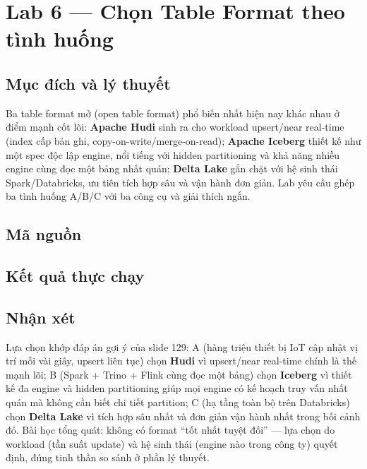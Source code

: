 \documentclass[12pt,a4paper,oneside]{article}
\begin{document}
\section{Lab 6 --- Chọn Table Format theo tình huống}
\label{sec:lab6}

\subsection{Mục đích và lý thuyết}

Ba table format mở (open table format) phổ biến nhất hiện nay khác nhau ở điểm mạnh cốt lõi: \textbf{Apache Hudi} sinh ra cho workload upsert/near real-time (index cấp bản ghi, copy-on-write/merge-on-read); \textbf{Apache Iceberg} thiết kế như một spec độc lập engine, nổi tiếng với hidden partitioning và khả năng nhiều engine cùng đọc một bảng nhất quán; \textbf{Delta Lake} gắn chặt với hệ sinh thái Spark/Databricks, ưu tiên tích hợp sâu và vận hành đơn giản. Lab yêu cầu ghép ba tình huống A/B/C với ba công cụ và giải thích ngắn.

\subsection{Mã nguồn}



\subsection{Kết quả thực chạy}



\subsection{Nhận xét}

Lựa chọn khớp đáp án gợi ý của slide 129: A (hàng triệu thiết bị IoT cập nhật vị trí mỗi vài giây, upsert liên tục) chọn \textbf{Hudi} vì upsert/near real-time chính là thế mạnh lõi; B (Spark + Trino + Flink cùng đọc một bảng) chọn \textbf{Iceberg} vì thiết kế đa engine và hidden partitioning giúp mọi engine có kế hoạch truy vấn nhất quán mà không cần biết chi tiết partition; C (hạ tầng toàn bộ trên Databricks) chọn \textbf{Delta Lake} vì tích hợp sâu nhất và đơn giản vận hành nhất trong bối cảnh đó. Bài học tổng quát: không có format ``tốt nhất tuyệt đối'' --- lựa chọn do workload (tần suất update) và hệ sinh thái (engine nào trong công ty) quyết định, đúng tinh thần so sánh ở phần lý thuyết.
\end{document}
